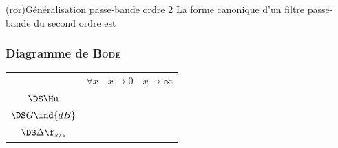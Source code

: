\documentclass[../../main/main.tex]{subfiles}
\begin{document}
\begin{tcb*}(ror){Généralisation passe-bande ordre 2}
	La forme canonique d'un filtre passe-bande du second ordre est
	\psw{%
		\[
			\boxed{\Hu(x) = \frac{H_0}{1 + \jj Q \left( x - \frac{1}{x} \right)}}
			\qav
			x = \frac{\w}{\w_0}
			\qet
			H_0 = \cte
			\qet
			Q \text{~ facteur de qualité}
		\]
	}%
	\vspace{-15pt}
\end{tcb*}
\subsubsection{Diagramme de \textsc{Bode}}
\begin{center}
	\begin{tabularx}{\linewidth}{cYYY}
		\toprule
		 &
		$\forall x$
		 &
		$x\to 0$
		 &
		$x\to\infty$
		\\
		\addlinespace[0.5em]
		\cmidrule(lr){2-4}
		$\DS\Hu$
		 &
		 &
		 &
		\\
		\addlinespace[0.5em]
		$\DS G\ind{dB}$
		 &
		 &
		 &
		\\
		\addlinespace[0.5em]
		$\DS\Delta\f_{s/e}$
		 &
		 &
		 &
		\\
		\bottomrule
	\end{tabularx}
	\label{tab:rlcr}
\end{center}
\end{document}
